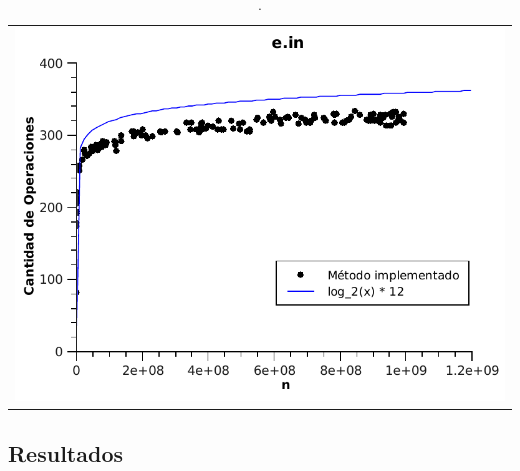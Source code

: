	\begin{table}[h!]
		\centering 
			\begin{tabular}{c}
				\includegraphics[scale = 0.8]{./../ej1/tests/e.pdf}
			\end{tabular}
			\caption{.}
			\label{grafico4} 
	\end{table}
	

\pagebreak[4]
\clearpage


\subsection{Resultados}
\label{resultadosej2}


